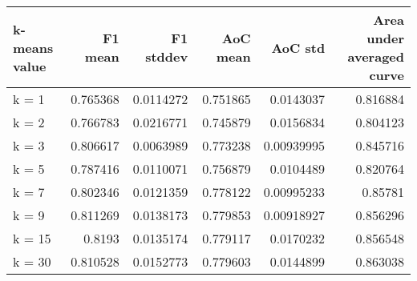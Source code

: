 \begin{tabular}{lrrrrr}
\toprule
 k-means value   &   F1 mean &   F1 stddev &   AoC mean &    AoC std &   Area under averaged curve \\
\midrule
 k = 1           &  0.765368 &   0.0114272 &   0.751865 & 0.0143037  &                    0.816884 \\
 k = 2           &  0.766783 &   0.0216771 &   0.745879 & 0.0156834  &                    0.804123 \\
 k = 3           &  0.806617 &   0.0063989 &   0.773238 & 0.00939995 &                    0.845716 \\
 k = 5           &  0.787416 &   0.0110071 &   0.756879 & 0.0104489  &                    0.820764 \\
 k = 7           &  0.802346 &   0.0121359 &   0.778122 & 0.00995233 &                    0.85781  \\
 k = 9           &  0.811269 &   0.0138173 &   0.779853 & 0.00918927 &                    0.856296 \\
 k = 15          &  0.8193   &   0.0135174 &   0.779117 & 0.0170232  &                    0.856548 \\
 k = 30          &  0.810528 &   0.0152773 &   0.779603 & 0.0144899  &                    0.863038 \\
\bottomrule
\end{tabular}